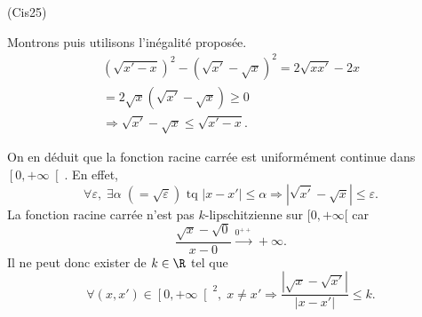 \begin{tiny}(Cis25)\end{tiny} Montrons puis utilisons l'inégalité proposée.
\begin{multline*}
 (\sqrt{x'-x})^2 - (\sqrt{x'} - \sqrt{x})^2
 = 2\sqrt{xx'} - 2x \\
 = 2\sqrt{x} (\sqrt{x'} - \sqrt{x}) \geq 0 \\
 \Rightarrow 
 \sqrt{x'} - \sqrt{x} \leq \sqrt{x' - x}.
\end{multline*}

On en déduit que la fonction racine carrée est uniformément continue dans $\left[ 0, + \infty\right[$. En effet,
\begin{displaymath}
 \forall \varepsilon, \; \exists \alpha\; ( =\sqrt{\varepsilon} )\text{ tq } 
 |x - x' | \leq \alpha \Rightarrow \left|\sqrt{x'} - \sqrt{x}\right| \leq \varepsilon.
\end{displaymath}
La fonction racine carrée n'est pas $k$-lipschitzienne sur $[0,+\infty[$ car
\[
 \frac{\sqrt{x} - \sqrt{0}}{x - 0} \xrightarrow{0^{++}} +\infty.
\]
Il ne peut donc exister de $k\in \R$ tel que
\[
 \forall (x,x') \in \left[ 0,+\infty\right[^2, \;
 x \neq x' \Rightarrow \frac{\left|\sqrt{x} - \sqrt{x'}\right|}{\left|x - x'\right|} \leq k.
\]
